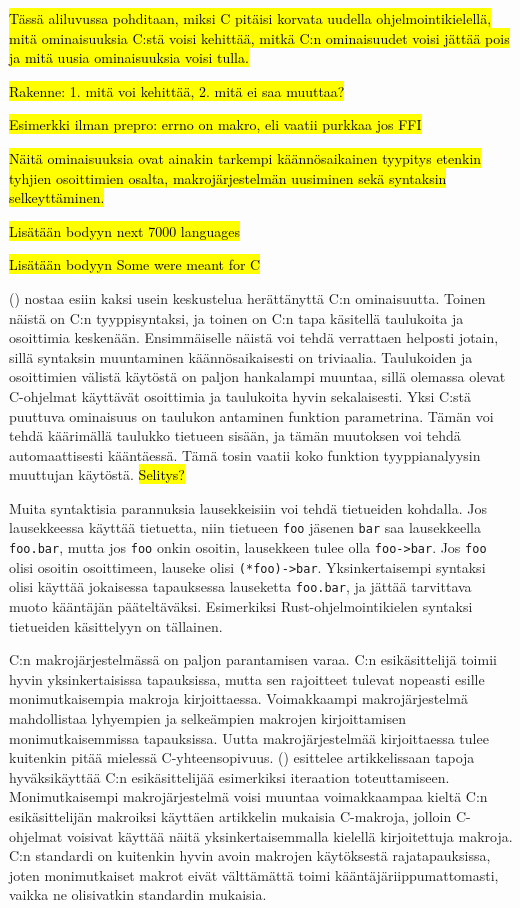 \hl{Tässä aliluvussa pohditaan, miksi C pitäisi korvata uudella
ohjelmointikielellä, mitä ominaisuuksia C:stä voisi kehittää, mitkä C:n
ominaisuudet voisi jättää pois ja mitä uusia ominaisuuksia voisi tulla.}

\hl{Rakenne: 1. mitä voi kehittää, 2. mitä ei saa muuttaa?}

\hl{Esimerkki ilman prepro: errno on makro, eli vaatii purkkaa jos FFI}

\hl{Näitä ominaisuuksia ovat ainakin tarkempi käännösaikainen tyypitys etenkin
tyhjien osoittimien osalta, makrojärjestelmän uusiminen sekä syntaksin
selkeyttäminen.}

\hl{Lisätään bodyyn next 7000 languages} \citep{next7000}

\hl{Lisätään bodyyn Some were meant for C} \citep{somemeantforc}

\citeauthor{chistory} (\citeyear{chistory}) nostaa esiin kaksi usein
keskustelua herättänyttä C:n ominaisuutta. Toinen näistä on C:n tyyppisyntaksi,
ja toinen on C:n tapa käsitellä taulukoita ja osoittimia keskenään.
Ensimmäiselle näistä voi tehdä verrattaen helposti jotain, sillä syntaksin
muuntaminen käännösaikaisesti on triviaalia. Taulukoiden ja osoittimien välistä
käytöstä on paljon hankalampi muuntaa, sillä olemassa olevat C-ohjelmat
käyttävät osoittimia ja taulukoita hyvin sekalaisesti. Yksi C:stä puuttuva
ominaisuus on taulukon antaminen funktion parametrina. Tämän voi tehdä
käärimällä taulukko tietueen sisään, ja tämän muutoksen voi tehdä
automaattisesti kääntäessä. Tämä tosin vaatii koko funktion tyyppianalyysin
muuttujan käytöstä. \hl{Selitys?}

Muita syntaktisia parannuksia lausekkeisiin voi tehdä tietueiden kohdalla. Jos
lausekkeessa käyttää tietuetta, niin tietueen \texttt{foo} jäsenen \texttt{bar}
saa lausekkeella \texttt{foo.bar}, mutta jos \texttt{foo} onkin osoitin,
lausekkeen tulee olla \texttt{foo->bar}. Jos \texttt{foo} olisi osoitin
osoittimeen, lauseke olisi \texttt{(*foo)->bar}. Yksinkertaisempi syntaksi
olisi käyttää jokaisessa tapauksessa lauseketta \texttt{foo.bar}, ja jättää
tarvittava muoto kääntäjän pääteltäväksi. Esimerkiksi Rust-ohjelmointikielen
syntaksi tietueiden käsittelyyn on tällainen.

C:n makrojärjestelmässä on paljon parantamisen varaa. C:n esikäsittelijä toimii
hyvin yksinkertaisissa tapauksissa, mutta sen rajoitteet tulevat nopeasti
esille monimutkaisempia makroja kirjoittaessa. Voimakkaampi makrojärjestelmä
mahdollistaa lyhyempien ja selkeämpien makrojen kirjoittamisen
monimutkaisemmissa tapauksissa. Uutta makrojärjestelmää kirjoittaessa tulee
kuitenkin pitää mielessä C-yhteensopivuus. \citeauthor{cabuse}
(\citeyear{cabuse}) esittelee artikkelissaan tapoja hyväksikäyttää C:n
esikäsittelijää esimerkiksi iteraation toteuttamiseen. Monimutkaisempi
makrojärjestelmä voisi muuntaa voimakkaampaa kieltä C:n esikäsittelijän
makroiksi käyttäen artikkelin mukaisia C-makroja, jolloin C-ohjelmat voisivat
käyttää näitä yksinkertaisemmalla kielellä kirjoitettuja makroja. C:n standardi
on kuitenkin hyvin avoin makrojen käytöksestä rajatapauksissa, joten
monimutkaiset makrot eivät välttämättä toimi kääntäjäriippumattomasti, vaikka
ne olisivatkin standardin mukaisia.

